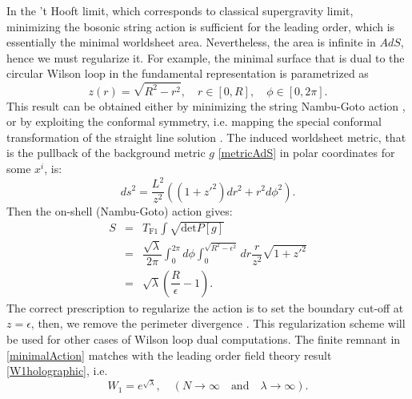 In the 't Hooft limit, which corresponds to classical supergravity limit,
minimizing the bosonic string action is sufficient for the leading order, which is essentially the minimal worldsheet area.
Nevertheless, the area is infinite in $AdS$, hence we must regularize it.
For example, the minimal surface that is dual to the circular Wilson loop in the fundamental representation
is parametrized as
\begin{equation}
 z(r)=\sqrt{R^2-r^2}, \quad r\in[0, R], \quad \phi\in[0, 2\pi].
\end{equation}
This result can be obtained either by minimizing the string Nambu-Goto action \cite{Drukker:1999zq},
or by exploiting the conformal symmetry, i.e. 
mapping the special conformal transformation of the straight line solution \cite{Berenstein:1998ij}.
The induced worldsheet metric, that is the pullback of the background metric $g$ \eqref{metricAdS} in polar coordinates for some $x^i$,
is:
\begin{equation}
 ds^2 = \dfrac{L^2}{z^2}\left((1+z'^2) dr^2 + r^2 d\phi^2 \right).
\end{equation}
Then the on-shell (Nambu-Goto) action gives:
\begin{eqnarray}
 S &=& T_\text{F1} \int \sqrt{\text{det} P[g]}\\
   &=& \dfrac{\sqrt{\lambda}}{2\pi} \int_0^{2\pi} d\phi \int_{0}^{\sqrt{R^2-\epsilon^2}} dr \dfrac{r}{z^2} \sqrt{1+z'^2}\\
   &=& \sqrt{\lambda} \left(\dfrac{R}{\epsilon}-1 \right). \label{minimalAction}
\end{eqnarray}
The correct prescription to regularize the action is to set the boundary cut-off at $z=\epsilon$,
then, we remove the perimeter divergence \cite{Drukker:1999zq}. 
This regularization scheme will be used for other cases of Wilson loop dual computations.
The finite remnant in \eqref{minimalAction} matches with the leading order field theory result \eqref{W1holographic}, i.e.
\begin{equation}
 W_1 = e^{\sqrt{\lambda}}, 
 \quad (N\rightarrow \infty \quad \text{and} \quad \lambda \rightarrow \infty).
\end{equation}

